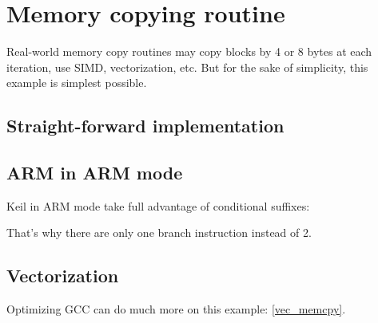 ﻿\ifx\RUSSIAN\undefined
\section{Memory copying routine}
\label{loop_memcpy}

Real-world memory copy routines may copy blocks by 4 or 8 bytes at each iteration, use \ac{SIMD}, 
vectorization, etc.
But for the sake of simplicity, this example is simplest possible.



\subsection{Straight-forward implementation}







\subsection{ARM in ARM mode}

Keil in ARM mode take full advantage of conditional suffixes:



That's why there are only one branch instruction instead of 2.

\subsection{Vectorization}

Optimizing GCC can do much more on this example: \ref{vec_memcpy}.

\fi